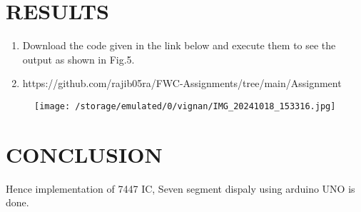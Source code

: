 \documentclass[conference]{IEEEtran}
\begin{document}
\section{RESULTS}
 \begin{enumerate}
	 \item Download the code given in the link below and execute them to see the output as shown in Fig.5. 
	 \item https://github.com/rajib05ra/FWC-Assignments/tree/main/Assignment%
 \end{enumerate}
		 \begin{figure}[h] 
	\centering 
	\texttt{[image:   /storage/emulated/0/vignan/IMG\_20241018\_153316.jpg]}
	\caption{\label{fig:Gates}}    
\end{figure}
\section{CONCLUSION}
Hence implementation of 7447 IC, Seven segment dispaly using arduino UNO is done.
\end{document}
